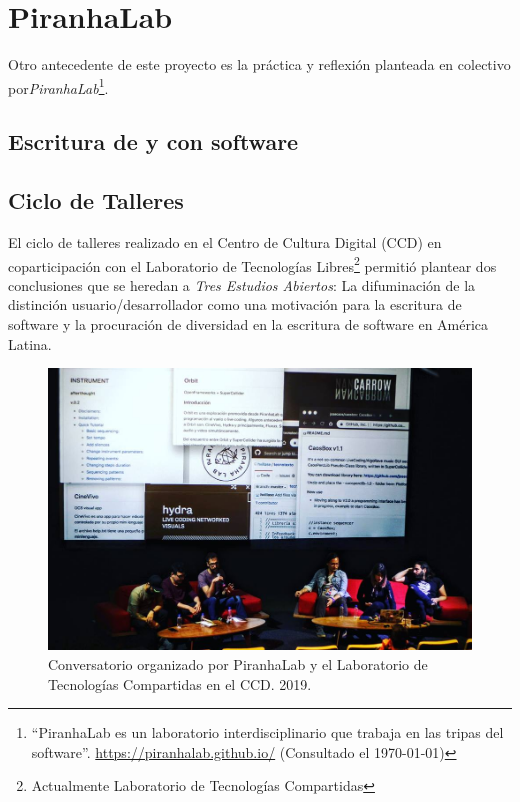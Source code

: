 \section{PiranhaLab}

Otro antecedente de este proyecto es la práctica y reflexión planteada en colectivo por\textit{PiranhaLab}\footnote{``PiranhaLab es un laboratorio interdisciplinario que trabaja en las tripas del software''. \url{https://piranhalab.github.io/} (Consultado el \today)}.

\subsection{Escritura de y con software}

\subsection{Ciclo de Talleres}

El ciclo de talleres realizado en el Centro de Cultura Digital (CCD) en coparticipación con el Laboratorio de Tecnologías Libres\footnote{Actualmente Laboratorio de Tecnologías Compartidas} permitió plantear dos conclusiones que se heredan a \textit{Tres Estudios Abiertos}: La difuminación de la distinción usuario/desarrollador como una motivación para la escritura de software y la procuración de diversidad en la escritura de software en América Latina.

\begin{figure}[tb]
\centering 
\includegraphics[width=\columnwidth]{img/conversatorio.jpg} 
\caption[Conversatorio CCD]{Conversatorio organizado por PiranhaLab y el Laboratorio de Tecnologías Compartidas en el CCD. 2019.} %
\label{fig:gallery} 
\end{figure}


